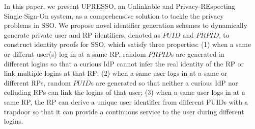 \begin{comment}


Moreover, BrowserID and SPRESSO are both redesigns of SSO systems, and therefore incompatible with existing widely deployed SSO systems (e.g., OAuth, OIDC and SAML). The new SSO systems require a complicated, formal and thorough security analysis of both the designs and various implementations. As shown in~\cite{BrowserID, browseridfett2014, gilbert2013formal}, vulnerabilities have been found in the implementation of BrowserID.
\end{comment}

In this paper, we present UPRESSO, an Unlinkable and Privacy-REspecting Single Sign-On system,
as a comprehensive solution to tackle the privacy problems in SSO. We propose novel identifier generation schemes to dynamically generate private user and RP identifiers, denoted as $PUID$ and $PRPID$, to construct identity proofs for SSO, which satisfy three properties: (1) when a same or differnt user(s) log in at a same RP, random $PRPID$s are generated in different logins so that a curious IdP cannot infer the real identity of the RP or link multiple logins at that RP; (2) when a same user logs in at a same or different RPs, random $PUID$s are generated so that neither a curious IdP nor colluding RPs can link the logins of that user; (3) when a same user logs in at a same RP, the RP can derive a unique user identifier from different PUIDs with a trapdoor so that it can provide a continuous service to the user during different logins.

